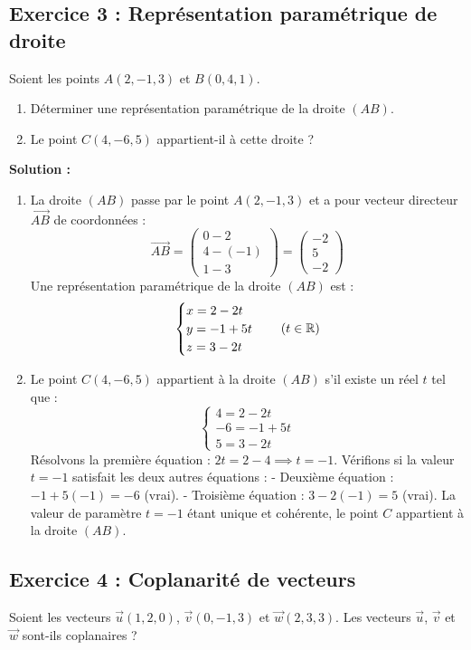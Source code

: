 \subsection*{Exercice 3 : Représentation paramétrique de droite}
Soient les points $A(2, -1, 3)$ et $B(0, 4, 1)$.
\begin{enumerate}
    \item Déterminer une représentation paramétrique de la droite $(AB)$.
    \item Le point $C(4, -6, 5)$ appartient-il à cette droite ?
\end{enumerate}

\textbf{Solution :}
\begin{enumerate}
    \item La droite $(AB)$ passe par le point $A(2, -1, 3)$ et a pour vecteur directeur $\vec{AB}$ de coordonnées :
    \[
    \vec{AB} = \begin{pmatrix} 0 - 2 \\ 4 - (-1) \\ 1 - 3 \end{pmatrix} = \begin{pmatrix} -2 \\ 5 \\ -2 \end{pmatrix}
    \]
    Une représentation paramétrique de la droite $(AB)$ est :
    \[
    \begin{cases}
    x = 2 - 2t \\
    y = -1 + 5t \\
    z = 3 - 2t
    \end{cases} \quad (t \in \mathbb{R})
    \]
    
    \item Le point $C(4, -6, 5)$ appartient à la droite $(AB)$ s'il existe un réel $t$ tel que :
    \[
    \begin{cases}
    4 = 2 - 2t \\
    -6 = -1 + 5t \\
    5 = 3 - 2t
    \end{cases}
    \]
    Résolvons la première équation : $2t = 2 - 4 \implies t = -1$.
    Vérifions si la valeur $t = -1$ satisfait les deux autres équations :
    - Deuxième équation : $-1 + 5(-1) = -6$ (vrai).
    - Troisième équation : $3 - 2(-1) = 5$ (vrai).
    La valeur de paramètre $t = -1$ étant unique et cohérente, le point $C$ appartient à la droite $(AB)$.
\end{enumerate}

\subsection*{Exercice 4 : Coplanarité de vecteurs}
Soient les vecteurs $\vec{u}(1, 2, 0)$, $\vec{v}(0, -1, 3)$ et $\vec{w}(2, 3, 3)$. Les vecteurs $\vec{u}$, $\vec{v}$ et $\vec{w}$ sont-ils coplanaires ?

